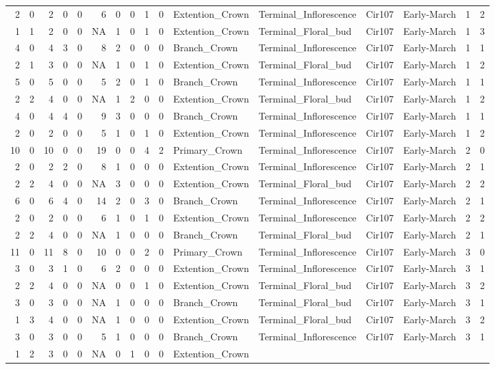 \documentclass[]{article}
\begin{document}
\begin{longtable}[]{@{}rrrrrrrrrrllllrl@{}}
2 & 0 & 2 & 0 & 0 & 6 & 0 & 0 & 1 & 0 & Extention\_Crown &
Terminal\_Inflorescence & Cir107 & Early-March & 1 & 2\tabularnewline
1 & 1 & 2 & 0 & 0 & NA & 1 & 0 & 1 & 0 & Extention\_Crown &
Terminal\_Floral\_bud & Cir107 & Early-March & 1 & 3\tabularnewline
4 & 0 & 4 & 3 & 0 & 8 & 2 & 0 & 0 & 0 & Branch\_Crown &
Terminal\_Inflorescence & Cir107 & Early-March & 1 & 1\tabularnewline
2 & 1 & 3 & 0 & 0 & NA & 1 & 0 & 1 & 0 & Extention\_Crown &
Terminal\_Floral\_bud & Cir107 & Early-March & 1 & 2\tabularnewline
5 & 0 & 5 & 0 & 0 & 5 & 2 & 0 & 1 & 0 & Branch\_Crown &
Terminal\_Inflorescence & Cir107 & Early-March & 1 & 1\tabularnewline
2 & 2 & 4 & 0 & 0 & NA & 1 & 2 & 0 & 0 & Extention\_Crown &
Terminal\_Floral\_bud & Cir107 & Early-March & 1 & 2\tabularnewline
4 & 0 & 4 & 4 & 0 & 9 & 3 & 0 & 0 & 0 & Branch\_Crown &
Terminal\_Inflorescence & Cir107 & Early-March & 1 & 1\tabularnewline
2 & 0 & 2 & 0 & 0 & 5 & 1 & 0 & 1 & 0 & Extention\_Crown &
Terminal\_Inflorescence & Cir107 & Early-March & 1 & 2\tabularnewline
10 & 0 & 10 & 0 & 0 & 19 & 0 & 0 & 4 & 2 & Primary\_Crown &
Terminal\_Inflorescence & Cir107 & Early-March & 2 & 0\tabularnewline
2 & 0 & 2 & 2 & 0 & 8 & 1 & 0 & 0 & 0 & Extention\_Crown &
Terminal\_Inflorescence & Cir107 & Early-March & 2 & 1\tabularnewline
2 & 2 & 4 & 0 & 0 & NA & 3 & 0 & 0 & 0 & Extention\_Crown &
Terminal\_Floral\_bud & Cir107 & Early-March & 2 & 2\tabularnewline
6 & 0 & 6 & 4 & 0 & 14 & 2 & 0 & 3 & 0 & Branch\_Crown &
Terminal\_Inflorescence & Cir107 & Early-March & 2 & 1\tabularnewline
2 & 0 & 2 & 0 & 0 & 6 & 1 & 0 & 1 & 0 & Extention\_Crown &
Terminal\_Inflorescence & Cir107 & Early-March & 2 & 2\tabularnewline
2 & 2 & 4 & 0 & 0 & NA & 1 & 0 & 0 & 0 & Branch\_Crown &
Terminal\_Floral\_bud & Cir107 & Early-March & 2 & 1\tabularnewline
11 & 0 & 11 & 8 & 0 & 10 & 0 & 0 & 2 & 0 & Primary\_Crown &
Terminal\_Inflorescence & Cir107 & Early-March & 3 & 0\tabularnewline
3 & 0 & 3 & 1 & 0 & 6 & 2 & 0 & 0 & 0 & Extention\_Crown &
Terminal\_Inflorescence & Cir107 & Early-March & 3 & 1\tabularnewline
2 & 2 & 4 & 0 & 0 & NA & 0 & 0 & 1 & 0 & Extention\_Crown &
Terminal\_Floral\_bud & Cir107 & Early-March & 3 & 2\tabularnewline
3 & 0 & 3 & 0 & 0 & NA & 1 & 0 & 0 & 0 & Branch\_Crown &
Terminal\_Floral\_bud & Cir107 & Early-March & 3 & 1\tabularnewline
1 & 3 & 4 & 0 & 0 & NA & 1 & 0 & 0 & 0 & Extention\_Crown &
Terminal\_Floral\_bud & Cir107 & Early-March & 3 & 2\tabularnewline
3 & 0 & 3 & 0 & 0 & 5 & 1 & 0 & 0 & 0 & Branch\_Crown &
Terminal\_Inflorescence & Cir107 & Early-March & 3 & 1\tabularnewline
1 & 2 & 3 & 0 & 0 & NA & 0 & 1 & 0 & 0 & Extention\_Crown &

\end{longtable}
\end{document}

